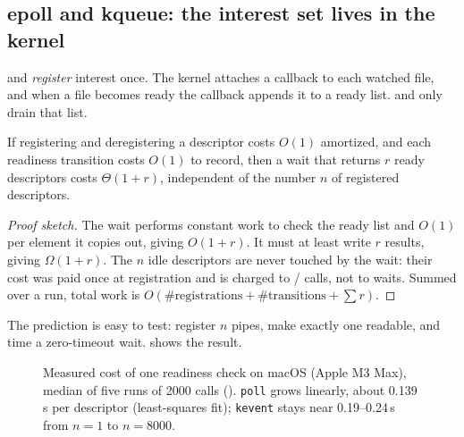 \subsection{epoll and kqueue: the interest set lives in the kernel}
 and  \emph{register} interest once. The kernel attaches a callback to each watched file, and
when a file becomes ready the callback appends it to a ready list.  and  only drain that list.

\begin{theorem}\label{thm:epoll}
If registering and deregistering a descriptor costs $O(1)$ amortized, and each readiness transition costs $O(1)$ to record,
then a wait that returns $r$ ready descriptors costs $\Theta(1+r)$, independent of the number $n$ of registered descriptors.
\end{theorem}
\begin{proof}[Proof sketch]
The wait performs constant work to check the ready list and $O(1)$ per element it copies out, giving $O(1+r)$. It must at least
write $r$ results, giving $\Omega(1+r)$. The $n$ idle descriptors are never touched by the wait: their cost was paid once
at registration and is charged to / calls, not to waits. Summed over a run, total work is
$O(\#\text{registrations}+\#\text{transitions}+\sum r)$.
\end{proof}

The prediction is easy to test: register $n$ pipes, make exactly one readable, and time a zero-timeout wait.
 shows the result.

\begin{figure}[htbp]
\centering
{}
\caption{Measured cost of one readiness check on macOS (Apple M3 Max), median of five runs of 2000 calls
(). \texttt{poll} grows linearly, about 0.139\,\textmu s per descriptor (least-squares fit);
\texttt{kevent} stays near 0.19--0.24\,\textmu s from $n=1$ to $n=8000$.}
\label{fig:pollbench}
\end{figure}

